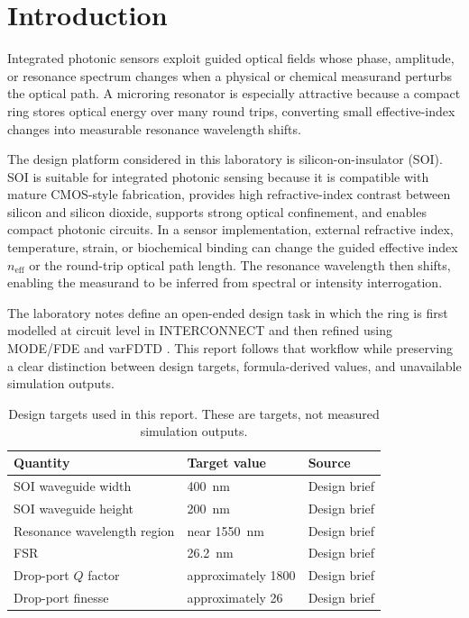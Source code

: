 \section{Introduction}
Integrated photonic sensors exploit guided optical fields whose phase, amplitude, or resonance spectrum changes when a physical or chemical measurand perturbs the optical path. A microring resonator is especially attractive because a compact ring stores optical energy over many round trips, converting small effective-index changes into measurable resonance wavelength shifts.

The design platform considered in this laboratory is silicon-on-insulator (SOI). SOI is suitable for integrated photonic sensing because it is compatible with mature CMOS-style fabrication, provides high refractive-index contrast between silicon and silicon dioxide, supports strong optical confinement, and enables compact photonic circuits. In a sensor implementation, external refractive index, temperature, strain, or biochemical binding can change the guided effective index \(n_{\mathrm{eff}}\) or the round-trip optical path length. The resonance wavelength then shifts, enabling the measurand to be inferred from spectral or intensity interrogation.

The laboratory notes define an open-ended design task in which the ring is first modelled at circuit level in INTERCONNECT and then refined using MODE/FDE and varFDTD \cite{labmanual}. This report follows that workflow while preserving a clear distinction between design targets, formula-derived values, and unavailable simulation outputs.

\begin{table}[H]
\centering
\caption{Design targets used in this report. These are targets, not measured simulation outputs.}
\label{tab:design-targets}
\begin{tabular}{lll}
\toprule
Quantity & Target value & Source \\
\midrule
SOI waveguide width & \SI{400}{\nano\metre} & Design brief \\
SOI waveguide height & \SI{200}{\nano\metre} & Design brief \\
Resonance wavelength region & near \SI{1550}{\nano\metre} & Design brief \\
FSR & \SI{26.2}{\nano\metre} & Design brief \\
Drop-port \(Q\) factor & approximately 1800 & Design brief \\
Drop-port finesse & approximately 26 & Design brief \\
\bottomrule
\end{tabular}
\end{table}

